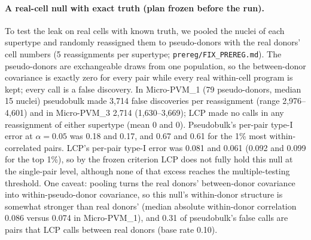 \paragraph{A real-cell null with exact truth (plan frozen before the run).} To test the leak on real cells with known truth, we pooled the nuclei of each supertype and randomly reassigned them to pseudo-donors with the real donors' cell numbers (5 reassignments per supertype; \texttt{prereg/FIX\_PREREG.md}). The pseudo-donors are exchangeable draws from one population, so the between-donor covariance is exactly zero for every pair while every real within-cell program is kept; every call is a false discovery. In Micro-PVM\_1 (79 pseudo-donors, median 15 nuclei) pseudobulk made 3{,}714 false discoveries per reassignment (range 2{,}976--4{,}601) and in Micro-PVM\_3 2{,}714 (1{,}630--3{,}669); LCP made no calls in any reassignment of either supertype (mean 0 and 0). Pseudobulk's per-pair type-I error at $\alpha=0.05$ was 0.18 and 0.17, and 0.67 and 0.61 for the 1\% most within-correlated pairs. LCP's per-pair type-I error was 0.081 and 0.061 (0.092 and 0.099 for the top 1\%), so by the frozen criterion LCP does not fully hold this null at the single-pair level, although none of that excess reaches the multiple-testing threshold. One caveat: pooling turns the real donors' between-donor covariance into within-pseudo-donor covariance, so this null's within-donor structure is somewhat stronger than real donors' (median absolute within-donor correlation 0.086 versus 0.074 in Micro-PVM\_1), and 0.31 of pseudobulk's false calls are pairs that LCP calls between real donors (base rate 0.10).
